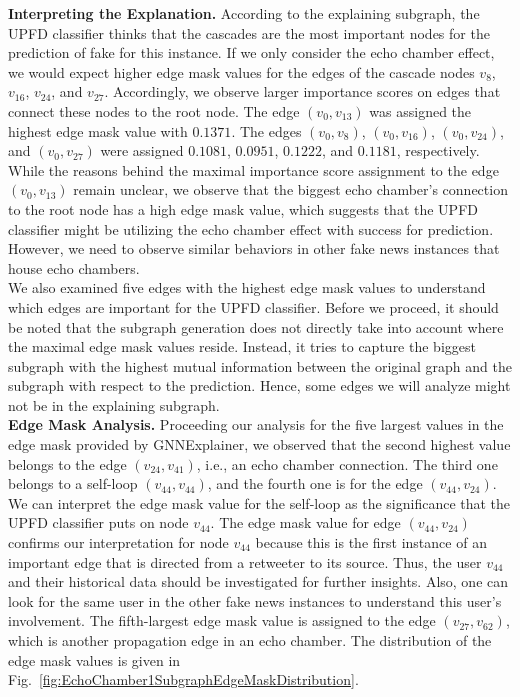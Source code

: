 \textbf{Interpreting the Explanation.} According to the explaining subgraph, the UPFD classifier thinks that the cascades are the most important nodes for the prediction of fake for this instance. If we only consider the echo chamber effect, we would expect higher edge mask values for the edges of the cascade nodes $v_8$, $v_{16}$, $v_{24}$, and $v_{27}$. Accordingly, we observe larger importance scores on edges that connect these nodes to the root node. The edge $(v_0, v_{13})$ was assigned the highest edge mask value with $0.1371$. The edges $(v_0, v_8)$, $(v_0, v_{16})$, $(v_0, v_{24})$, and $(v_0, v_{27})$ were assigned $0.1081$, $0.0951$, $0.1222$, and $0.1181$, respectively.  While the reasons behind the maximal importance score assignment to the edge $(v_0, v_{13})$ remain unclear, we observe that the biggest echo chamber's connection to the root node has a high edge mask value, which suggests that the UPFD classifier might be utilizing the echo chamber effect with success for prediction. However, we need to observe similar behaviors in other fake news instances that house echo chambers.\\
We also examined five edges with the highest edge mask values to understand which edges are important for the UPFD classifier. Before we proceed, it should be noted that the subgraph generation does not directly take into account where the maximal edge mask values reside. Instead, it tries to capture the biggest subgraph with the highest mutual information between the original graph and the subgraph with respect to the prediction. Hence, some edges we will analyze might not be in the explaining subgraph.\\
\textbf{Edge Mask Analysis.} Proceeding our analysis for the five largest values in the edge mask provided by GNNExplainer, we observed that the second highest value belongs to the edge $(v_{24}, v_{41})$, i.e., an echo chamber connection. The third one belongs to a self-loop $(v_{44}, v_{44})$, and the fourth one is for the edge $(v_{44}, v_{24})$. We can interpret the edge mask value for the self-loop as the significance that the UPFD classifier puts on node $v_{44}$. The edge mask value for edge $(v_{44}, v_{24})$ confirms our interpretation for node $v_{44}$ because this is the first instance of an important edge that is directed from a retweeter to its source. Thus, the user $v_{44}$ and their historical data should be investigated for further insights. Also, one can look for the same user in the other fake news instances to understand this user's involvement. The fifth-largest edge mask value is assigned to the edge $(v_{27}, v_{62})$, which is another propagation edge in an echo chamber. The distribution of the edge mask values is given in Fig.~\ref{fig:EchoChamber1SubgraphEdgeMaskDistribution}.\\
